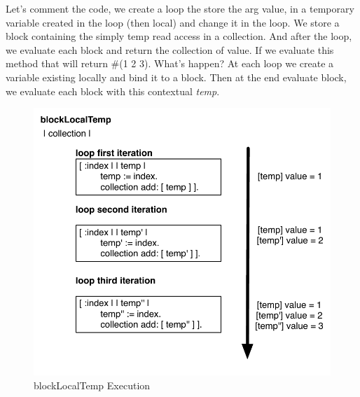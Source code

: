 \documentclass[a4paper,10pt,twoside]{book}
\begin{document}
Let's comment the code, we create a loop the store the arg value, in a temporary variable created in the loop (then local) and change it in the loop. We store a block containing the simply temp read access in a collection. And after the loop, we evaluate each block and return the collection of value.
If we evaluate this method that will return \#(1 2 3). What's happen? At each loop we create a variable existing locally and bind it to a block. Then at the end evaluate block, we evaluate each block with this contextual \emph{temp}. 

\begin{figure}[htbp]
	\centering
        \includegraphics[width=0.7\linewidth]{blockClosureLocalTemp}
	\caption{blockLocalTemp Execution}
	\label{fig:blockLocalTempExecution}
\end{figure}
\end{document}
